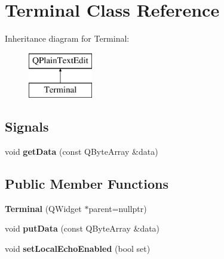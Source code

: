 \hypertarget{class_terminal}{}\section{Terminal Class Reference}
\label{class_terminal}
Inheritance diagram for Terminal\+:\begin{figure}[H]
\begin{center}
\leavevmode
\includegraphics[height=2.000000cm]{class_terminal}
\end{center}
\end{figure}
\subsection*{Signals}
\begin{DoxyCompactItemize}
\item 
\mbox{\label{class_terminal_ad5fe047293b606cf74f43167b6d76ee7}} 
void {\bfseries get\+Data} (const Q\+Byte\+Array \&data)
\end{DoxyCompactItemize}
\subsection*{Public Member Functions}
\begin{DoxyCompactItemize}
\item 
\mbox{\label{class_terminal_afa3eab645e6303f4fc757811b813cbf2}} 
{\bfseries Terminal} (Q\+Widget $\ast$parent=nullptr)
\item 
\mbox{\label{class_terminal_a50a6f25b887378b2bba3950a98c63c2b}} 
void {\bfseries put\+Data} (const Q\+Byte\+Array \&data)
\item 
\mbox{\label{class_terminal_abe0c62010f6793e58a59b1056cf1bf7f}} 
void {\bfseries set\+Local\+Echo\+Enabled} (bool set)
\end{DoxyCompactItemize}
